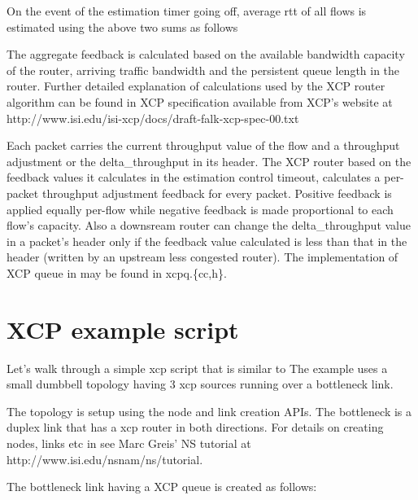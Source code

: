     On the event of the estimation timer going off, average rtt of all
    flows is estimated using the above two sums as follows

    
    The aggregate feedback is calculated based on the available bandwidth
    capacity of the router, arriving traffic bandwidth and the persistent
    queue length in the router. Further detailed explanation of
    calculations used by the XCP router algorithm can be found in XCP
    specification available from XCP's website at
    http://www.isi.edu/isi-xcp/docs/draft-falk-xcp-spec-00.txt 
    
    Each packet carries the current throughput value of the flow and a
    throughput adjustment or the delta\_throughput in its header. The XCP
    router based on the feedback values it calculates in the estimation
    control timeout, calculates a per-packet throughput adjustment
    feedback for every packet. Positive feedback is applied equally
    per-flow while negative feedback is made proportional to each flow's
    capacity. Also a downsream router can change the delta\_throughput
    value in a packet's header only if the feedback value calculated is
    less than that in the header (written by an upstream less congested
    router). The implementation of XCP queue in \ns{} may be found in
    xcpq.\{cc,h\}. 
  
  
  
    \section{XCP example script}
    \label{sec:example}
    
    Let's walk through a simple xcp script that is similar to
    The example uses a small dumbbell topology having 3 xcp sources
    running over a bottleneck link.
    
    The topology is setup using the node and link creation APIs. The bottleneck
    is a duplex link that has a xcp router in both directions. For
    details on creating nodes, links etc in \ns{} see Marc Greis' NS
    tutorial at http://www.isi.edu/nsnam/ns/tutorial.
  
    The bottleneck link having a XCP queue is created as follows:

